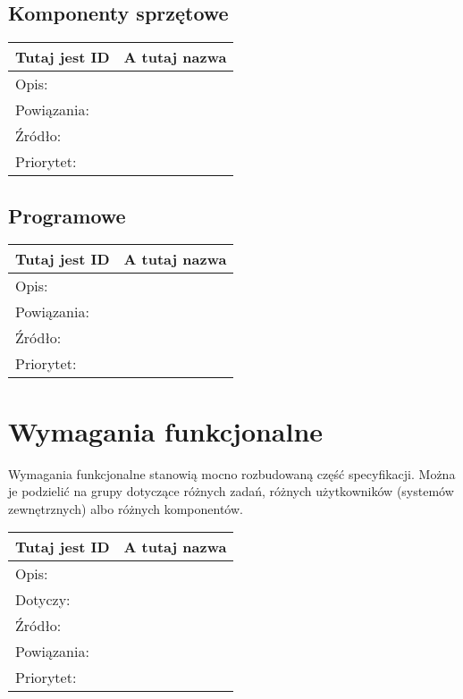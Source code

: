 \documentclass[a4paper,10pt]{article}
\begin{document}
\subsection{Komponenty sprzętowe}

\begin{center}
\begin{tabular}{|l|l|} \hline

Tutaj jest ID & A tutaj nazwa \\ \hline
Opis: &  \\ \hline
Powiązania: &  \\ \hline
Źródło: &  \\ \hline
Priorytet: &  \\ \hline

\end{tabular}
\end{center}

\subsection{Programowe}

\begin{center}
\begin{tabular}{|l|l|} \hline

Tutaj jest ID & A tutaj nazwa \\ \hline
Opis: &  \\ \hline
Powiązania: &  \\ \hline
Źródło: &  \\ \hline
Priorytet: &  \\ \hline

\end{tabular}
\end{center}

\section{Wymagania funkcjonalne}

Wymagania funkcjonalne stanowią mocno rozbudowaną część specyfikacji. Można je podzielić na grupy dotyczące różnych zadań, różnych użytkowników (systemów zewnętrznych) albo różnych komponentów.

\begin{center}
\begin{tabular}{|l|l|} \hline

Tutaj jest ID & A tutaj nazwa \\ \hline
Opis: &  \\ \hline
Dotyczy: &  \\ \hline
Źródło: &  \\ \hline
Powiązania: & \\ \hline
Priorytet: &  \\ \hline

\end{tabular}
\end{center}
\end{document}
